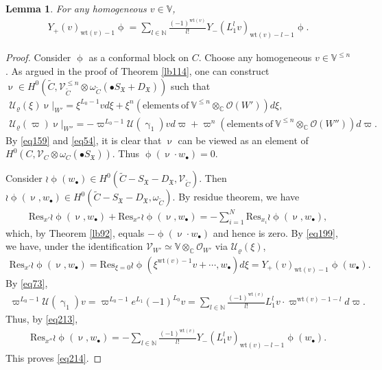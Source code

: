 \documentclass[12pt,a4paper,notitlepage]{report}
\theoremstyle{definition}
\theoremstyle{plain}
\newtheorem{lm}[df]{Lemma}
\newcommand{\fk}{\mathfrak}
\newcommand{\mc}{\mathcal}
\newcommand{\wtd}{\widetilde}
\newcommand{\Res}{\mathrm{Res}}
\newcommand{\scr}{\mathscr}
\newcommand{\SX}{S_{\fk X}}
\newcommand{\DX}{D_{\fk X}}
\newcommand{\blt}{\bullet}
\newcommand{\Vbb}{\mathbb V}
\newcommand{\Cbb}{\mathbb C}
\newcommand{\Nbb}{\mathbb N}
\newcommand{\wt}{\mathrm{wt}}
\numberwithin{equation}{section}
\begin{document}
\begin{lm}\label{lb116}
For any homogeneous $v\in\Vbb$,
\begin{align}
Y_+(v)_{\wt(v)-1}\upphi=\sum_{l\in\Nbb}\frac{(-1)^{\wt(v)}}{l!}Y_-(L_1^lv)_{\wt(v)-l-1}\upphi.\label{eq214}
\end{align}
\end{lm}
\begin{proof}
Consider $\upphi$ as a conformal block on $C$. Choose any homogeneous $v\in\Vbb^{\leq n}$.  As argued in the proof of Theorem \ref{lb114}, one can construct $\upnu\in H^0(\wtd C,\scr V_{\wtd C}^{\leq n}\otimes\omega_{\wtd C}(\blt\SX+\DX))$ such that
\begin{gather*}
\mc U_\varrho(\xi)\upnu|_{W'}=\xi^{L_0-1}vd\xi +\xi^n(\mathrm{elements~of~}\Vbb^{\leq n}\otimes_\Cbb\scr O(W'))d\xi,\\
\mc U_\varrho(\varpi)\upnu|_{W''}=-\varpi^{L_0-1}\mc U(\upgamma_1)vd\varpi+\varpi^n(\mathrm{elements~of~}\Vbb^{\leq n}\otimes_\Cbb\scr O(W''))d\varpi.
\end{gather*}
By \eqref{eq159} and \eqref{eq54}, it is clear that $\upnu$ can be viewed as an element of $H^0(C,\scr V_C\otimes\omega_C(\blt\SX))$. Thus $\upphi(\upnu\cdot w_\blt)=0$. 

Consider $\wr\upphi(w_\blt)\in H^0(\wtd C-\SX-\DX,\scr V_{\wtd C})$. Then $\wr\upphi(\upnu,w_\blt)\in H^0(\wtd C-\SX-\DX,\omega_{\wtd C})$. By residue theorem, we have
\begin{align*}
\Res_{x'}\wr\upphi(\upnu,w_\blt)+\Res_{x''}\wr\upphi(\upnu,w_\blt)=-\sum_{i=1}^N \Res_{x_i}\wr\upphi(\upnu,w_\blt),
\end{align*}
which, by Theorem \ref{lb92}, equals $-\upphi(\upnu\cdot w_\blt)$ and hence is zero. By \eqref{eq199}, we have, under the identification $\scr V_{W'}\simeq\Vbb\otimes_\Cbb\scr O_{W'}$  via $\mc U_\varrho(\xi)$,
\begin{align*}
\Res_{x'}\wr\upphi(\upnu,w_\blt)=\Res_{\xi=0}\wr\upphi(\xi^{\wt(v)-1}v+\cdots,w_\blt)d\xi=Y_+(v)_{\wt(v)-1}\upphi(w_\blt).
\end{align*}
By \eqref{eq73},
\begin{align*}
\varpi^{L_0-1}\mc U(\upgamma_1)v=\varpi^{L_0-1}e^{L_1}(-1)^{L_0}v=\sum_{l\in\Nbb}\frac{(-1)^{\wt(v)}}{l!}L_1^lv\cdot \varpi^{\wt(v)-1-l}d\varpi.
\end{align*}
Thus, by \eqref{eq213},
\begin{align*}
\Res_{x''}\wr\upphi(\upnu,w_\blt)=-\sum_{l\in\Nbb}\frac{(-1)^{\wt(v)}}{l!}Y_-(L_1^lv)_{\wt(v)-l-1}\upphi(w_\blt).
\end{align*}
This proves \eqref{eq214}.
\end{proof}
\end{document}
